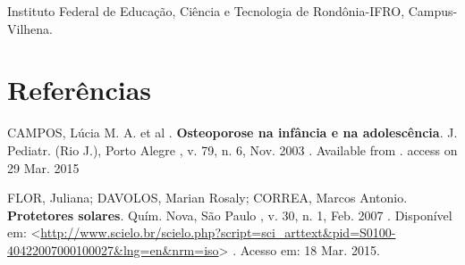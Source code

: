 \documentclass[article,12pt,onesidea,4paper,english,brazil]{abntex2}
\begin{document}
	Instituto Federal de Educação, Ciência e Tecnologia de Rondônia-IFRO, Campus- Vilhena.
	
	\section*{Referências}
	
\noindent CAMPOS, Lúcia M. A. et al . \textbf{Osteoporose na infância e na adolescência}. J. Pediatr. (Rio J.), Porto Alegre , v. 79, n. 6, Nov. 2003 . Available from . access on 29 Mar. 2015

\noindent FLOR, Juliana; DAVOLOS, Marian Rosaly; CORREA, Marcos Antonio. \textbf{Protetores solares}. Quím. Nova, São Paulo , v. 30, n. 1, Feb. 2007 . Disponível em:
<\url{http://www.scielo.br/scielo.php?script=sci\_arttext\&pid=S0100- 40422007000100027\&lng=en\&nrm=iso}> . Acesso em: 18 Mar. 2015.
\end{document}
